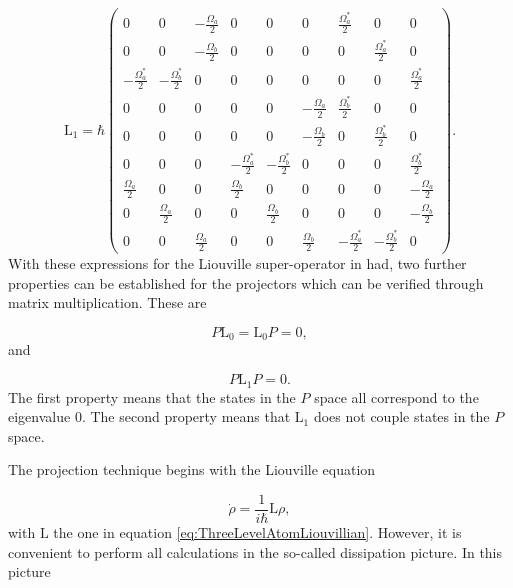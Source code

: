 \documentclass[12pt]{article}
\begin{document}
\begin{equation}
    \mathrm{L}_1 = \hbar\begin{pmatrix}0 & 0 & -\frac{ \Omega_a}{2} & 0 & 0 & 0 & \frac{ \Omega_a^*}{2} & 0 & 0\\
0 & 0 & -\frac{ \Omega_b}{2} & 0 & 0 & 0 & 0 & \frac{ \Omega_a^*}{2} & 0\\
-\frac{ \Omega_a^*}{2} & -\frac{ \Omega_b^*}{2} & 0 & 0 & 0 & 0 & 0 & 0 & \frac{ \Omega_a^*}{2}\\
0 & 0 & 0 & 0 & 0 & -\frac{ \Omega_a}{2} & \frac{ \Omega_b^*}{2} & 0 & 0\\
0 & 0 & 0 & 0 & 0 & -\frac{ \Omega_b}{2} & 0 & \frac{ \Omega_b^*}{2} & 0\\
0 & 0 & 0 & -\frac{ \Omega_a^*}{2} & -\frac{ \Omega_b^*}{2} & 0 & 0 & 0 & \frac{ \Omega_b^*}{2}\\
\frac{ \Omega_a}{2} & 0 & 0 & \frac{ \Omega_b}{2} & 0 & 0 & 0 & 0 & -\frac{ \Omega_a}{2}\\
0 & \frac{ \Omega_a}{2} & 0 & 0 & \frac{ \Omega_b}{2} & 0 & 0 & 0 & -\frac{ \Omega_b}{2}\\
0 & 0 & \frac{ \Omega_a}{2} & 0 & 0 & \frac{ \Omega_b}{2} & -\frac{ \Omega_a^*}{2} & -\frac{ \Omega_b^*}{2} & 0\end{pmatrix}.
\end{equation} With these expressions for the Liouville super-operator in had, two further properties can be established for the projectors which can be verified through matrix multiplication. These are

\begin{equation}
    P\mathrm{L}_0 = \mathrm{L}_0P = 0,
\end{equation} and

\begin{equation}
    P\mathrm{L}_1P = 0.
\end{equation} The first property means that the states in the $P$  space all correspond to the eigenvalue 0. The second property means that $\mathrm{L}_1$ does not couple states in the $P$ space. 

The projection technique begins with the Liouville equation

\begin{equation}
    \dot{\rho} =\frac{1}{i\hbar} \mathrm{L}\rho,
\end{equation} with $\mathrm{L}$ the one in equation \eqref{eq:ThreeLevelAtomLiouvillian}. However, it is convenient to perform all calculations in the so-called dissipation picture. In this picture
\end{document}
